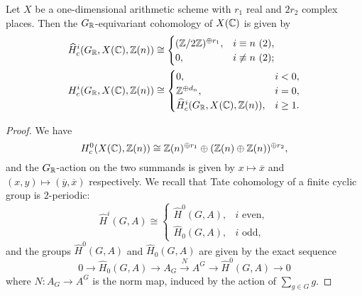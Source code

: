 \documentclass[draft]{article}
\numberwithin{equation}{section}
\begin{document}
\begin{proposition}
  Let $X$ be a one-dimensional arithmetic scheme with $r_1$ real and $2r_2$
  complex places. Then the $G_{\mathbb{R}}$-equivariant cohomology of $X(\mathbb{C})$ is given
  by
  \begin{align*}
    \widehat{H}^i_c (G_{\mathbb{R}}, X(\mathbb{C}), \mathbb{Z} (n)) & \cong
                                              \begin{cases}
                                                (\mathbb{Z}/2\mathbb{Z})^{\oplus r_1}, & i \equiv n ~ (2), \\
                                                0, & i \not\equiv n ~ (2);
                                              \end{cases} \\
    H^i_c (G_{\mathbb{R}}, X(\mathbb{C}), \mathbb{Z} (n)) & \cong
                                    \begin{cases}
                                      0, & i < 0, \\
                                      \mathbb{Z}^{\oplus d_n}, & i = 0, \\
                                      \widehat{H}^i_c (G_{\mathbb{R}}, X(\mathbb{C}), \mathbb{Z} (n)), & i \ge 1.
                                    \end{cases}
  \end{align*}

  \begin{proof}
    We have
    \[ H^0_c (X(\mathbb{C}), \mathbb{Z}(n)) \cong
      \mathbb{Z} (n)^{\oplus r_1} \oplus (\mathbb{Z} (n) \oplus \mathbb{Z} (n))^{\oplus r_2}, \]
    and the $G_{\mathbb{R}}$-action on the two summands is given by
    $x \mapsto \overline{x}$ and $(x,y) \mapsto (\overline{y}, \overline{x})$
    respectively. We recall that Tate cohomology of a finite cyclic group is
    $2$-periodic:
    \[ \widehat{H}^i (G,A) \cong
      \begin{cases}
        \widehat{H}^0 (G,A), & i\text{ even}, \\
        \widehat{H}_0 (G,A), & i\text{ odd},
      \end{cases} \]
    and the groups $\widehat{H}^0 (G,A)$ and $\widehat{H}_0 (G,A)$ are given by
    the exact sequence
    \[ 0 \to \widehat{H}_0 (G,A) \to
      A_G \xrightarrow{N} A^G \to
      \widehat{H}^0 (G,A) \to 0 \]
    where $N\colon A_G\to A^G$ is the norm map, induced by the action of
    $\sum_{g\in G} g$.

    \vspace{1em}


\end{proof}
\end{proposition}
\end{document}
